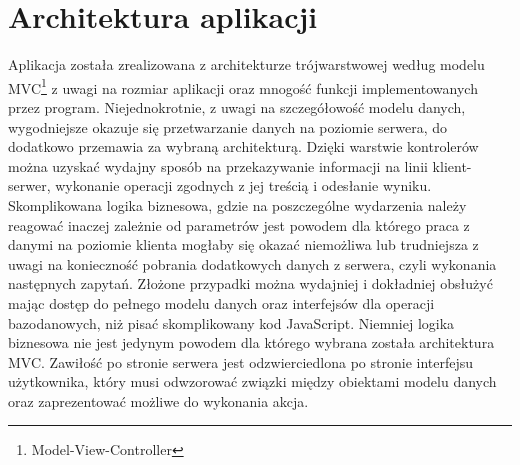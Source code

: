 	\section{Architektura aplikacji}
		Aplikacja została zrealizowana z architekturze trójwarstwowej według modelu MVC\footnote{Model-View-Controller} z uwagi na rozmiar aplikacji oraz mnogość funkcji implementowanych przez program. Niejednokrotnie, z uwagi na szczegółowość modelu danych, wygodniejsze okazuje się przetwarzanie danych na poziomie serwera, do dodatkowo przemawia za wybraną architekturą. Dzięki warstwie kontrolerów można uzyskać wydajny sposób na przekazywanie informacji na linii klient-serwer, wykonanie operacji zgodnych z jej treścią i odesłanie wyniku. Skomplikowana logika biznesowa, gdzie na poszczególne wydarzenia należy reagować inaczej zależnie od parametrów jest powodem dla którego praca z danymi na poziomie klienta mogłaby się okazać niemożliwa lub trudniejsza z uwagi na konieczność pobrania dodatkowych danych z serwera, czyli wykonania następnych zapytań. Złożone przypadki można wydajniej i dokładniej obsłużyć mając dostęp do pełnego modelu danych oraz interfejsów dla operacji bazodanowych, niż pisać skomplikowany kod JavaScript. Niemniej logika biznesowa nie jest jedynym powodem dla którego wybrana została architektura MVC. Zawiłość po stronie serwera jest odzwierciedlona po stronie interfejsu użytkownika, który musi odwzorować związki między obiektami modelu danych oraz zaprezentować możliwe do wykonania akcja.  
